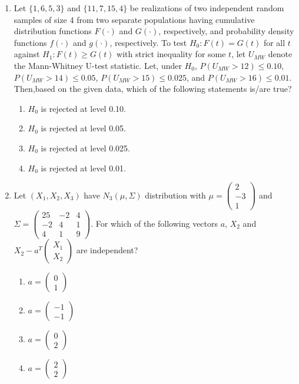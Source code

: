 \documentclass[journal,12pt,onecolumn]{IEEEtran}
\theoremstyle{remark}
\begin{document}
\begin{enumerate}
    \item Let $\{1, 6, 5, 3\}$ and $\{11, 7, 15, 4\}$ be realizations of two independent random samples of size 4 from two separate populations having cumulative distribution functions $F(\cdot)$ and $G(\cdot)$, respectively, and probability density functions $f(\cdot)$ and $g(\cdot)$, respectively. To test $H_0: F(t) = G(t)$ for all $t$ against $H_1: F(t) \geq G(t)$ with strict inequality for some $t$, let $U_{MW}$ denote the Mann-Whitney U-test statistic. Let, under $H_0$, $P(U_{MW} > 12) \leq 0.10$, $P(U_{MW} > 14) \leq 0.05$, $P(U_{MW} > 15) \leq 0.025$, and $P(U_{MW} > 16) \leq 0.01$. Then,based on the given data, which of the following statements is/are true?
    \begin{enumerate}
        \item $H_0$ is rejected at level 0.10.
        \item $H_0$ is rejected at level 0.05.
        \item $H_0$ is rejected at level 0.025.
        \item $H_0$ is rejected at level 0.01.
    \end{enumerate}

    \item Let $(X_1, X_2, X_3)$ have $N_3(\mu, \Sigma)$ distribution with $\mu = \begin{pmatrix} 2 \\ -3 \\ 1 \end{pmatrix}$ and $\Sigma = \begin{pmatrix} 25 & -2 & 4 \\ -2 & 4 & 1 \\ 4 & 1 & 9 \end{pmatrix}$. For which of the following vectors $a$, $X_2$ and $X_2 - a^T \begin{pmatrix} X_1 \\ X_2 \end{pmatrix}$ are independent?
    \begin{enumerate}
        \item $a = \begin{pmatrix}  0 \\ 1 \end{pmatrix}$
        \item $a = \begin{pmatrix}  -1 \\ -1 \end{pmatrix}$
        \item $a = \begin{pmatrix}  0 \\ 2 \end{pmatrix}$
        \item $a = \begin{pmatrix}  2 \\ 2 \end{pmatrix}$
    \end{enumerate}


\end{enumerate}
\end{document}
